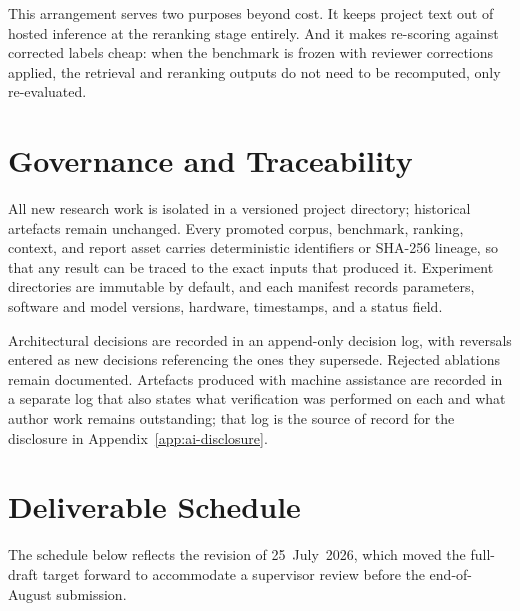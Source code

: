 This arrangement serves two purposes beyond cost. It keeps project text out of hosted inference at the reranking stage entirely. And it makes re-scoring against corrected labels cheap: when the benchmark is frozen with reviewer corrections applied, the retrieval and reranking outputs do not need to be recomputed, only re-evaluated.

\section{Governance and Traceability}
\label{sec:context-governance}

All new research work is isolated in a versioned project directory; historical artefacts remain unchanged. Every promoted corpus, benchmark, ranking, context, and report asset carries deterministic identifiers or SHA-256 lineage, so that any result can be traced to the exact inputs that produced it. Experiment directories are immutable by default, and each manifest records parameters, software and model versions, hardware, timestamps, and a status field.

Architectural decisions are recorded in an append-only decision log, with reversals entered as new decisions referencing the ones they supersede. Rejected ablations remain documented. Artefacts produced with machine assistance are recorded in a separate log that also states what verification was performed on each and what author work remains outstanding; that log is the source of record for the disclosure in Appendix~\ref{app:ai-disclosure}.

\section{Deliverable Schedule}
\label{sec:context-schedule}

The schedule below reflects the revision of 25~July~2026, which moved the full-draft target forward to accommodate a supervisor review before the end-of-August submission.

